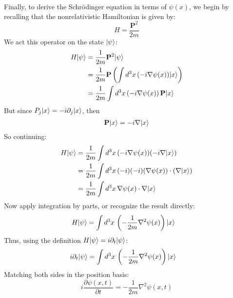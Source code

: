 \documentclass[12pt]{article}
\DeclarePairedDelimiter\ket{\lvert}{\rangle}
\begin{document}
Finally, to derive the Schrödinger equation in terms of $\psi(x)$, we begin by recalling that the nonrelativistic Hamiltonian is given by:
\begin{equation*}
    H = \frac{\mathbf{P}^2}{2m}
\end{equation*}
We act this operator on the state $\ket{\psi}$:
\begin{align*}
    H\ket{\psi} &= \frac{1}{2m} \mathbf{P}^2 \ket{\psi} \\
    &= \frac{1}{2m} \mathbf{P} \left( \int d^3x \, (-i \nabla \psi(x)) \ket{x} \right) \\
    &= \frac{1}{2m} \int d^3x \, (-i \nabla \psi(x)) \, \mathbf{P} \ket{x}
\end{align*}
But since $P_j \ket{x} = -i \partial_j \ket{x}$, then
\begin{align*}
    \mathbf{P} \ket{x} = -i \nabla \ket{x}
\end{align*}
So continuing:
\begin{align*}
    H\ket{\psi} &= \frac{1}{2m} \int d^3x \, (-i \nabla \psi(x)) (-i \nabla \ket{x}) \\
    &= \frac{1}{2m} \int d^3x \, (-i)(-i) (\nabla \psi(x)) \cdot (\nabla \ket{x}) \\
    &= \frac{1}{2m} \int d^3x \, \nabla \psi(x) \cdot \nabla \ket{x}
\end{align*}
Now apply integration by parts, or recognize the result directly:
\begin{align*}
    H\ket{\psi} &= \int d^3x \, \left( -\frac{1}{2m} \nabla^2 \psi(x) \right) \ket{x}
\end{align*}
Thus, using the definition $H\ket{\psi} = i \partial_t \ket{\psi}$:
\begin{align*}
    i \partial_t \ket{\psi} &= \int d^3x \, \left( -\frac{1}{2m} \nabla^2 \psi(x) \right) \ket{x}
\end{align*}
Matching both sides in the position basis:
\begin{equation*}
    \boxed{i \frac{\partial \psi(x,t)}{\partial t} = -\frac{1}{2m} \nabla^2 \psi(x,t)}
\end{equation*}
\end{document}
